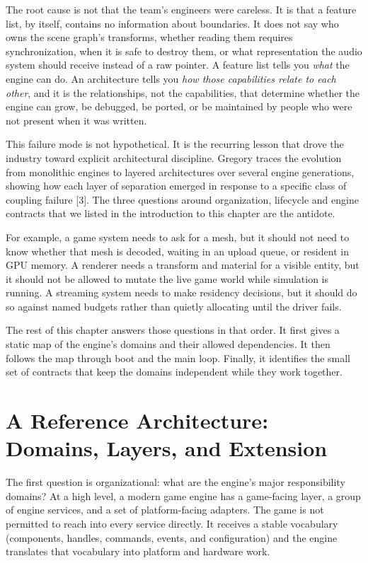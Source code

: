 \documentclass[
  11pt,
  letterpaper,
  DIV=11,
  numbers=noendperiod,
  twoside,
  open=right]{scrreprt}
\begin{document}
The root cause is not that the team's engineers were careless. It is
that a feature list, by itself, contains no information about
boundaries. It does not say who owns the scene graph's transforms,
whether reading them requires synchronization, when it is safe to
destroy them, or what representation the audio system should receive
instead of a raw pointer. A feature list tells you \emph{what} the
engine can do. An architecture tells you \emph{how those capabilities
relate to each other}, and it is the relationships, not the
capabilities, that determine whether the engine can grow, be debugged,
be ported, or be maintained by people who were not present when it was
written.

This failure mode is not hypothetical. It is the recurring lesson that
drove the industry toward explicit architectural discipline. Gregory
traces the evolution from monolithic engines to layered architectures
over several engine generations, showing how each layer of separation
emerged in response to a specific class of coupling failure {[}3{]}. The
three questions around organization, lifecycle and engine contracts that
we listed in the introduction to this chapter are the antidote.

For example, a game system needs to ask for a mesh, but it should not
need to know whether that mesh is decoded, waiting in an upload queue,
or resident in GPU memory. A renderer needs a transform and material for
a visible entity, but it should not be allowed to mutate the live game
world while simulation is running. A streaming system needs to make
residency decisions, but it should do so against named budgets rather
than quietly allocating until the driver fails.

The rest of this chapter answers those questions in that order. It first
gives a static map of the engine's domains and their allowed
dependencies. It then follows the map through boot and the main loop.
Finally, it identifies the small set of contracts that keep the domains
independent while they work together.

\section{A Reference Architecture: Domains, Layers, and
Extension}\label{a-reference-architecture-domains-layers-and-extension}

The first question is organizational: what are the engine's major
responsibility domains? At a high level, a modern game engine has a
game-facing layer, a group of engine services, and a set of
platform-facing adapters. The game is not permitted to reach into every
service directly. It receives a stable vocabulary (components, handles,
commands, events, and configuration) and the engine translates that
vocabulary into platform and hardware work.
\end{document}
